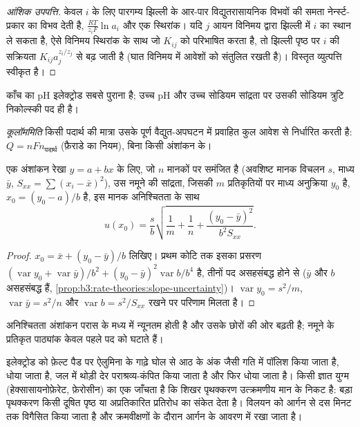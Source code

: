 \begin{proof}[आंशिक उपपत्ति]
केवल $i$ के लिए पारगम्य झिल्ली के आर-पार विद्युतरासायनिक
विभवों की समता नेर्न्स्ट-प्रकार का विभव देती है, $\frac{RT}{z_iF}\ln a_i$ और एक स्थिरांक।
यदि $j$ आयन विनिमय द्वारा झिल्ली में $i$ का स्थान ले सकता है, ऐसे विनिमय
स्थिरांक के साथ जो $K_{ij}$ को परिभाषित करता है, तो झिल्ली पृष्ठ पर $i$ की सक्रियता
$K_{ij}a_j^{z_i/z_j}$ से बढ़ जाती है (घात विनिमय में आवेशों को संतुलित रखती है)। विस्तृत
व्युत्पत्ति स्वीकृत है।
\end{proof}

काँच का pH इलेक्ट्रोड सबसे पुराना  है; उच्च pH और उच्च सोडियम सांद्रता पर
उसकी सोडियम त्रुटि निकोल्स्की पद ही है।

\begin{definition}[कूलॉममिति]\label{def:b3:electrode-kinetics:coulometry}
\emph{कूलॉममिति} किसी पदार्थ की मात्रा उसके पूर्ण वैद्युत-अपघटन में
प्रवाहित कुल आवेश से निर्धारित करती है: $Q = nFn_{\text{पदार्थ}}$ (फ़ैराडे का
नियम), बिना किसी अंशांकन के।
\end{definition}

\begin{proposition}[अंशांकन रेखा से पढ़ी गई सांद्रता की अनिश्चितता]\label{prop:b3:electrode-kinetics:inverse-prediction}
एक अंशांकन रेखा $y = a + bx$ के लिए, जो $n$ मानकों पर समंजित है (अवशिष्ट मानक
विचलन $s$, माध्य $\bar y$, $S_{xx} = \sum(x_i - \bar x)^2$), उस नमूने की सांद्रता, जिसकी
$m$ प्रतिकृतियों पर माध्य अनुक्रिया $y_0$ है, $x_0 = (y_0 - a)/b$ है, इस मानक
अनिश्चितता के साथ
\[
  u(x_0) = \frac{s}{b}\sqrt{\frac1m + \frac1n + \frac{(y_0 - \bar y)^2}{b^2S_{xx}}} .
\]
\end{proposition}

\begin{proof}
$x_0 = \bar x + (y_0 - \bar y)/b$ लिखिए। प्रथम कोटि तक इसका प्रसरण $(\operatorname{var}y_0 +
\operatorname{var}\bar y)/b^2 + (y_0 - \bar y)^2\operatorname{var}b/b^4$ है, तीनों पद असहसंबद्ध होने से ($\bar y$ और $b$
असहसंबद्ध हैं, \cref{prop:b3:rate-theories:slope-uncertainty})। $\operatorname{var}y_0 =
s^2/m$, $\operatorname{var}\bar y = s^2/n$ और $\operatorname{var}b = s^2/S_{xx}$ रखने पर परिणाम मिलता है।
\end{proof}

अनिश्चितता अंशांकन परास के मध्य में न्यूनतम होती है और उसके छोरों की ओर
बढ़ती है; नमूने के प्रतिकृत पाठ्यांक केवल पहले पद को घटाते हैं।

\begin{inthelab}[काँचाभ-कार्बन इलेक्ट्रोड तैयार करना]
इलेक्ट्रोड को फ़ेल्ट पैड पर ऐलुमिना के गाढ़े घोल से
आठ के अंक जैसी गति में पॉलिश किया जाता है, धोया जाता है, जल में थोड़ी देर पराश्रव्य-कंपित किया जाता है और फिर धोया जाता है।
किसी ज्ञात युग्म (हेक्सासायनोफ़ेरेट, फ़ेरोसीन) का एक  जाँचता है कि
शिखर पृथक्करण उत्क्रमणीय मान के निकट है: बड़ा पृथक्करण किसी
दूषित पृष्ठ या अप्रतिकारित प्रतिरोध का संकेत देता है। विलयन को आर्गन से
दस मिनट तक विगैसित किया जाता है और क्रमवीक्षणों के दौरान आर्गन के आवरण में रखा जाता है।
\end{inthelab}

